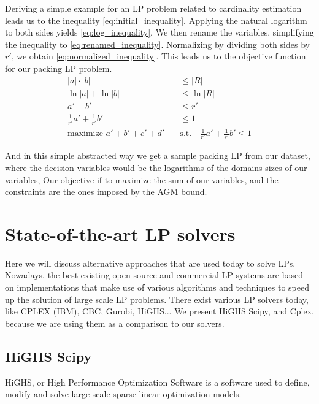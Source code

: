 Deriving a simple example for an LP problem related to cardinality estimation leads us to the inequality \ref{eq:initial_inequality}. Applying the natural logarithm to both sides yields \ref{eq:log_inequality}. We then rename the variables, simplifying the inequality to \ref{eq:renamed_inequality}.
Normalizing by dividing both sides by \(r'\), we obtain \ref{eq:normalized_inequality}. This leads us to the objective function for our packing LP problem.
\begin{align}
    |a| \cdot |b|                            & \leq |R| \label{eq:initial_inequality}                                                   \\
    \ln|a| + \ln|b|                          & \leq \ln|R| \label{eq:log_inequality}                                                    \\
    a' + b'                                  & \leq r' \label{eq:renamed_inequality}                                                    \\
    \frac{1}{r'} a' + \frac{1}{r'} b'        & \leq 1 \label{eq:normalized_inequality}                                                  \\
    \text{maximize } a' + b' + c' + d' \quad & \text{s.t.} \quad \frac{1}{r'} a' + \frac{1}{r'} b' \leq 1 \label{eq:objective_function}
\end{align}

And in this simple abstracted way we get a sample packing LP from our dataset, where the decision variables would be the logarithms of the domains sizes of our variables, Our objective if to maximize the sum of our variables, and the constraints are the ones imposed by the AGM bound.

\section{State-of-the-art LP solvers}
Here we will discuss alternative approaches that are used today to solve LPs. Nowadays, the best
existing open-source and commercial LP-systems are based on implementations that make use
of various algorithms and techniques to speed up the solution of large scale LP problems.
There exist various LP solvers today, like CPLEX (IBM), CBC, Gurobi, HiGHS... We present HiGHS Scipy, and
Cplex, because we are using them as a comparison to our solvers.
\subsection{HiGHS Scipy}
HiGHS, or High Performance Optimization Software is a software used to define,
modify and solve large scale sparse linear optimization models.

